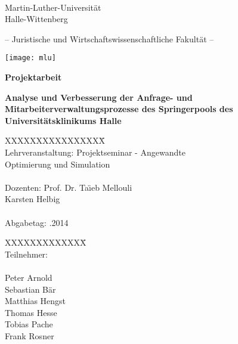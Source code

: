 \label{Titelseite}

\begin{titlepage}
\begin{center}

\ 

\vspace{2\baselineskip}

Martin-Luther-Universität\\
Halle-Wittenberg

\vspace{\baselineskip}

-- Juristische und Wirtschaftswissenschaftliche Fakultät --

\vspace{\baselineskip}

\texttt{[image: mlu]}

\vspace{\baselineskip}

\textbf{Projektarbeit}

\vspace{\baselineskip}

\renewcommand{\baselinestretch}{1.4}\normalsize
\textbf{\Large{Analyse und Verbesserung der Anfrage- und Mitarbeiterverwaltungsprozesse des Springerpools des Universitätsklinikums Halle}}

\renewcommand{\baselinestretch}{1.00}\normalsize
\vspace{\baselineskip}

\parbox{0cm}{
\begin{tabbing}
XXXXXXXXXXXXXXXX\= \kill \\ 
Lehrveranstaltung:\> Projektseminar - Angewandte\\\> Optimierung und Simulation\\
\\
Dozenten:
\> Prof. Dr. Ta\"{\i}eb Mellouli\\
\> Karsten Helbig \\
\\
Abgabetag: .2014
\end{tabbing}}

\vspace{3\baselineskip}

\parbox{0cm}{
\begin{tabbing}
XXXXXXXXXXXXX\= \kill \\
Teilnehmer:\>\\
\\
Peter Arnold\\
Sebastian Bär\\
Matthias Hengst\\
Thomas Hesse\\
Tobias Pache\\
Frank Rosner
\end{tabbing}
}

\end{center}
\end{titlepage}
